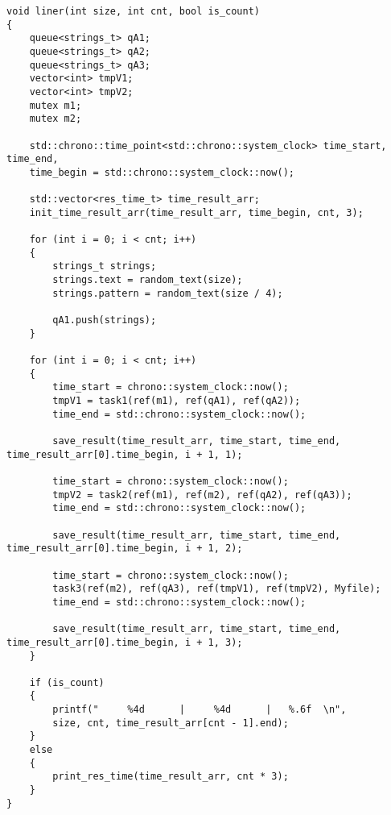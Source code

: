 \begin{center}
\captionsetup{justification=raggedright,singlelinecheck=off}
\begin{lstlisting}[label=lst:linear_processing,caption=Функция алгоритма линейной обработки строки]
void liner(int size, int cnt, bool is_count)
{
	queue<strings_t> qA1;
	queue<strings_t> qA2;
	queue<strings_t> qA3;
	vector<int> tmpV1;
	vector<int> tmpV2;
	mutex m1;
	mutex m2;
	
	std::chrono::time_point<std::chrono::system_clock> time_start, time_end,
	time_begin = std::chrono::system_clock::now();
	
	std::vector<res_time_t> time_result_arr;
	init_time_result_arr(time_result_arr, time_begin, cnt, 3);
	
	for (int i = 0; i < cnt; i++)
	{
		strings_t strings;
		strings.text = random_text(size);
		strings.pattern = random_text(size / 4);
		
		qA1.push(strings);
	}
	
	for (int i = 0; i < cnt; i++)
	{
		time_start = chrono::system_clock::now();
		tmpV1 = task1(ref(m1), ref(qA1), ref(qA2));
		time_end = std::chrono::system_clock::now();
		
		save_result(time_result_arr, time_start, time_end, time_result_arr[0].time_begin, i + 1, 1);
		
		time_start = chrono::system_clock::now();
		tmpV2 = task2(ref(m1), ref(m2), ref(qA2), ref(qA3));
		time_end = std::chrono::system_clock::now();
		
		save_result(time_result_arr, time_start, time_end, time_result_arr[0].time_begin, i + 1, 2);
		
		time_start = chrono::system_clock::now();
		task3(ref(m2), ref(qA3), ref(tmpV1), ref(tmpV2), Myfile);
		time_end = std::chrono::system_clock::now();
		
		save_result(time_result_arr, time_start, time_end, time_result_arr[0].time_begin, i + 1, 3);
	}
	
	if (is_count)
	{
		printf("     %4d      |     %4d      |   %.6f  \n",
		size, cnt, time_result_arr[cnt - 1].end);
	}
	else
	{
		print_res_time(time_result_arr, cnt * 3);
	}
}
\end{lstlisting}
\end{center}


